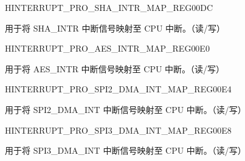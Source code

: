 \begin{register}{H}{INTERRUPT\_PRO\_SHA\_INTR\_MAP\_REG}{\hexprefix{}00DC}\label{regdesc:INTERRUPTPROSHAINTRMAPREG}
%
%
\regnewline%
\begin{regdesc}\begin{reglist}
\label{fielddesc:INTERRUPTPROSHAINTRMAP}\item [INTERRUPT\_PRO\_SHA\_INTR\_MAP] 用于将 SHA\_INTR 中断信号映射至 CPU 中断。（读/写）
\end{reglist}\end{regdesc}
\end{register}


\begin{register}{H}{INTERRUPT\_PRO\_AES\_INTR\_MAP\_REG}{\hexprefix{}00E0}\label{regdesc:INTERRUPTPROAESINTRMAPREG}
%
%
\regnewline%
\begin{regdesc}\begin{reglist}
\label{fielddesc:INTERRUPTPROAESINTRMAP}\item [INTERRUPT\_PRO\_AES\_INTR\_MAP] 用于将 AES\_INTR 中断信号映射至 CPU 中断。（读/写）
\end{reglist}\end{regdesc}
\end{register}


\begin{register}{H}{INTERRUPT\_PRO\_SPI2\_DMA\_INT\_MAP\_REG}{\hexprefix{}00E4}\label{regdesc:INTERRUPTPROSPI2DMAINTMAPREG}
%
%
\regnewline%
\begin{regdesc}\begin{reglist}
\label{fielddesc:INTERRUPTPROSPI2DMAINTMAP}\item [INTERRUPT\_PRO\_SPI2\_DMA\_INT\_MAP] 用于将 SPI2\_DMA\_INT 中断信号映射至 CPU 中断。（读/写）
\end{reglist}\end{regdesc}
\end{register}


\begin{register}{H}{INTERRUPT\_PRO\_SPI3\_DMA\_INT\_MAP\_REG}{\hexprefix{}00E8}\label{regdesc:INTERRUPTPROSPI3DMAINTMAPREG}
%
%
\regnewline%
\begin{regdesc}\begin{reglist}
\label{fielddesc:INTERRUPTPROSPI3DMAINTMAP}\item [INTERRUPT\_PRO\_SPI3\_DMA\_INT\_MAP] 用于将 SPI3\_DMA\_INT 中断信号映射至 CPU 中断。（读/写）
\end{reglist}\end{regdesc}
\end{register}




